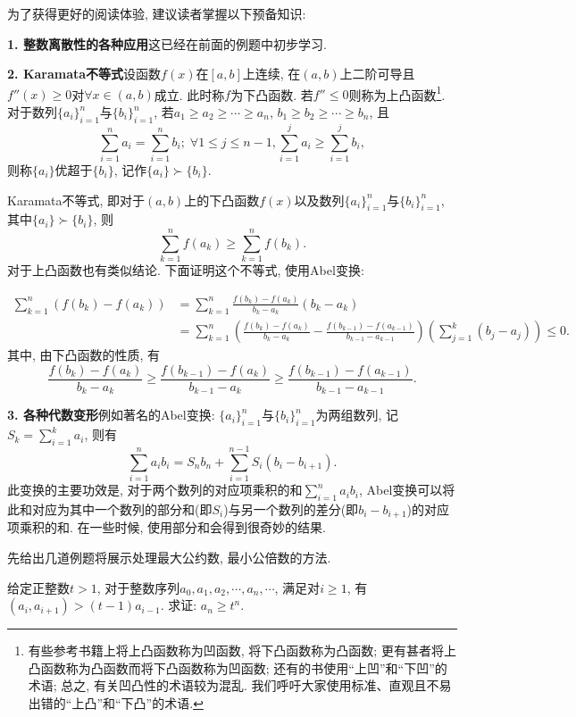 \documentclass[lang=cn,12pt,thmcnt=section]{elegantbook}
\begin{document}
为了获得更好的阅读体验, 建议读者掌握以下预备知识:\par 
\textbf{1. 整数离散性的各种应用}\quad 这已经在前面的例题中初步学习.\par 
\textbf{2. Karamata不等式}\quad 设函数$f(x)$在$[a,b]$上连续, 在$(a,b)$上二阶可导且$f''(x)\ge 0$对$\forall x\in (a,b)$成立. 此时称$f$为下凸函数. 若$f''\le 0$则称为上凸函数\footnote{有些参考书籍上将上凸函数称为凹函数, 将下凸函数称为凸函数; 更有甚者将上凸函数称为凸函数而将下凸函数称为凹函数; 还有的书使用“上凹”和“下凹”的术语; 总之, 有关凹凸性的术语较为混乱. 我们呼吁大家使用标准、直观且不易出错的“上凸”和“下凸”的术语.}. 对于数列$\{a_i\}_{i=1}^{n}$与$\{b_i\}_{i=1}^{n}$, 若$a_1\ge a_2\ge\cdots\ge a_n$, $b_1\ge b_2\ge\cdots\ge b_n$, 且
\[\sum_{i=1}^{n}a_i=\sum_{i=1}^{n}b_i;\;\forall1\leq j\leq n-1, \sum_{i=1}^{j}a_{i}\ge\sum_{i=1}^{j}b_{i},\]
则称$\{a_i\}$优超于$\{b_i\}$, 记作$\{a_i\}\succ\{b_i\}$. \par
Karamata不等式, 即对于$(a,b)$上的下凸函数$f(x)$以及数列$\{a_i\}_{i=1}^{n}$与$\{b_i\}_{i=1}^{n}$, 其中$\{a_i\}\succ\{b_i\}$, 则
\[\sum_{k=1}^{n}f(a_k)\ge\sum_{k=1}^{n}f(b_k).\]
对于上凸函数也有类似结论. 下面证明这个不等式, 使用Abel变换:\par 
\begin{align*}
\sum_{k=1}^{n}(f(b_{k})-f(a_{k}))&=\sum_{k=1}^{n}\frac{f(b_{k})-f(a_{k})}{b_{k}-a_{k}}(b_{k}-a_{k})\\
&=\sum_{k=1}^{n}\left(\frac{f(b_{k})-f(a_{k})}{b_{k}-a_{k}}-\frac{f(b_{k-1})-f(a_{k-1})}{b_{k-1}-a_{k-1}}\right)\left(\sum_{j=1}^{k}(b_{j}-a_{j})\right)\le 0.
\end{align*}
其中, 由下凸函数的性质, 有
\[\frac{f(b_{k})-f(a_{k})}{b_{k}-a_{k}}\ge\frac{f(b_{k-1})-f(a_{k})}{b_{k-1}-a_{k}}\ge \frac{f(b_{k-1})-f(a_{k-1})}{b_{k-1}-a_{k-1}}.\]\par 
\textbf{3. 各种代数变形}\quad 例如著名的Abel变换: $\{a_i\}_{i=1}^{n}$与$\{b_i\}_{i=1}^{n}$为两组数列, 记$S_k=\sum_{i=1}^{k}a_i$, 则有
\[\sum_{i=1}^{n}a_ib_i=S_nb_n+\sum_{i=1}^{n-1}S_i(b_i-b_{i+1}).\]
此变换的主要功效是, 对于两个数列的对应项乘积的和$\sum_{i=1}^{n}a_ib_i$, Abel变换可以将此和对应为其中一个数列的部分和(即$S_i$)与另一个数列的差分(即$b_i-b_{i+1}$)的对应项乘积的和. 在一些时候, 使用部分和会得到很奇妙的结果. 

先给出几道例题将展示处理最大公约数, 最小公倍数的方法.

\begin{example}
给定正整数$t>1$, 对于整数序列$a_0,a_1,a_2,\cdots,a_n,\cdots$, 满足对$i\ge 1$, 有$(a_i,a_{i+1})> (t-1)a_{i-1}$. 求证: $a_n\ge t^n$.
\end{example}
\end{document}
